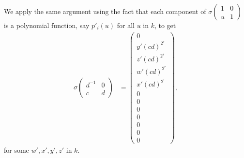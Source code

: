 We apply the same argument using the fact that each component of $\sigma\left(\begin{matrix} 1 & 0 \\ u & 1\end{matrix}\right)$ is a polynomial function, say $p'_i(u)$ for all $u$ in $k$, to get
\begin{align*}
\sigma\left(\begin{matrix} d^{-1} & 0 \\ c & d \end{matrix}\right) &=
\left( \begin{matrix}
0 \\
y'(cd)^{2^s} \\
z'(cd)^{2^s} \\
w'(cd)^{2^r} \\
x'(cd)^{2^r} \\
0 \\
0 \\
0 \\
0 \\
0 \\
0 \\
0
\end{matrix} \right),
\end{align*}
for some $w', x', y', z'$ in $k$.

